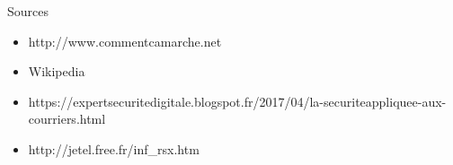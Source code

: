\documentclass{beamer}
\begin{document}
\begin{frame}
\begin{block}{Sources}
\begin{itemize}
    \item http://www.commentcamarche.net
   
    \item Wikipedia
    
    \item https://expertsecuritedigitale.blogspot.fr/2017/04/la-securiteappliquee-aux-courriers.html
    
    \item http://jetel.free.fr/inf\_rsx.htm
\end{itemize}
\end{block}
\end{frame}
\end{document}
